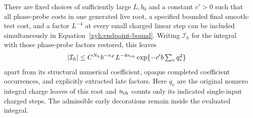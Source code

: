 \begin{lemma}\label{xyh:budget}
There are fixed choices of sufficiently large $L,b_0$ and a constant
$c'>0$ such that all phase-probe costs in one generated live root, a specified
bounded final smooth-test cost, and a factor $L^{-4}$ at every small
charged linear step can be included simultaneously in
Equation~\eqref{xyh:endpoint-bound}. Writing $\mathcal I_h$ for the
integral with those phase-probe factors restored, this leaves
\begin{equation}\label{xyh:paid-bound}
 |\mathcal I_h|\le
 C^{N_h}b^{-n_F}L^{-4n_{\rm ch}}
       \exp\{-c'b\textstyle\sum_vq_v^2\}
\end{equation}
apart from its structural numerical coefficient, opaque completed
coefficient occurrences, and explicitly extracted late factors. Here
$q_v$ are the original nonzero integral charge leaves of this root and
$n_{\rm ch}$ counts only its indicated single-input charged steps. The
admissible early decorations remain inside the evaluated integral.
\end{lemma}
